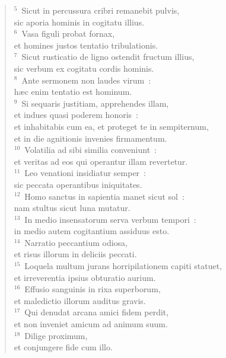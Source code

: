 \begin{flushleft}\begin{verse}${}^{5}$~Sicut in percussura cribri remanebit pulvis,\\ sic aporia hominis in cogitatu illius.\\
${}^{6}$~Vasa figuli probat fornax,\\ et homines justos tentatio tribulationis.\\
${}^{7}$~Sicut rusticatio de ligno ostendit fructum illius,\\ sic verbum ex cogitatu cordis hominis.\\
${}^{8}$~Ante sermonem non laudes virum~:\\ h\ae c enim tentatio est hominum.\\
${}^{9}$~Si sequaris justitiam, apprehendes illam,\\ et indues quasi poderem honoris~:\\ et inhabitabis cum ea, et proteget te in sempiternum,\\ et in die agnitionis invenies firmamentum.\\
${}^{10}$~Volatilia ad sibi similia conveniunt~:\\ et veritas ad eos qui operantur illam revertetur.\\
${}^{11}$~Leo venationi insidiatur semper~:\\ sic peccata operantibus iniquitates.\\
${}^{12}$~Homo sanctus in sapientia manet sicut sol~:\\ nam stultus sicut luna mutatur.\\
${}^{13}$~In medio insensatorum serva verbum tempori~:\\ in medio autem cogitantium assiduus esto.\\
${}^{14}$~Narratio peccantium odiosa,\\ et risus illorum in deliciis peccati.\\
${}^{15}$~Loquela multum jurans horripilationem capiti statuet,\\ et irreverentia ipsius obturatio aurium.\\
${}^{16}$~Effusio sanguinis in rixa superborum,\\ et maledictio illorum auditus gravis.\\
${}^{17}$~Qui denudat arcana amici fidem perdit,\\ et non inveniet amicum ad animum suum.\\
${}^{18}$~Dilige proximum,\\ et conjungere fide cum illo.\\

\end{verse}
\end{flushleft}
